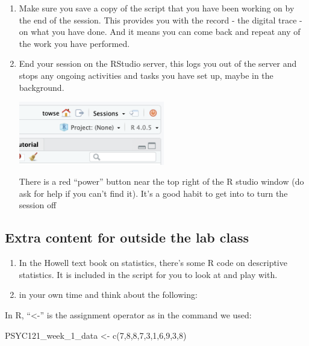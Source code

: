\documentclass[
]{book}
\newenvironment{Shaded}{\begin{snugshade}}{\end{snugshade}}
\newcommand{\DecValTok}[1]{\textcolor[rgb]{0.00,0.00,0.81}{#1}}
\newcommand{\FunctionTok}[1]{\textcolor[rgb]{0.00,0.00,0.00}{#1}}
\newcommand{\NormalTok}[1]{#1}
\newcommand{\OtherTok}[1]{\textcolor[rgb]{0.56,0.35,0.01}{#1}}
\begin{document}
\begin{enumerate}
\def\labelenumi{\alph{enumi})}
\item
  Make sure you save a copy of the script that you have been working on by the end of the session. This provides you with the record - the digital trace - on what you have done. And it means you can come back and repeat any of the work you have performed.
\item
  End your session on the RStudio server, this logs you out of the server and stops any ongoing activities and tasks you have set up, maybe in the background.

  \includegraphics[width=2.5in,height=\textheight]{files/Week_1/power_button.png}

  There is a red ``power'' button near the top right of the R studio window (do ask for help if you can't find it). It's a good habit to get into to turn the session off
\end{enumerate}

\hypertarget{extra-content-for-outside-the-lab-class}{%
\subsection{Extra content for outside the lab class}\label{extra-content-for-outside-the-lab-class}}

\begin{enumerate}
\def\labelenumi{\alph{enumi})}
\item
  In the Howell text book on statistics, there's some R code on descriptive statistics. It is included in the script for you to look at and play with.
\item
  in your own time and think about the following:
\end{enumerate}

In R, ``\textless-'' is the assignment operator as in the command we used:

\begin{Shaded}
\begin{Highlighting}[]
\NormalTok{PSYC121\_week\_1\_data }\OtherTok{\textless{}{-}} \FunctionTok{c}\NormalTok{(}\DecValTok{7}\NormalTok{,}\DecValTok{8}\NormalTok{,}\DecValTok{8}\NormalTok{,}\DecValTok{7}\NormalTok{,}\DecValTok{3}\NormalTok{,}\DecValTok{1}\NormalTok{,}\DecValTok{6}\NormalTok{,}\DecValTok{9}\NormalTok{,}\DecValTok{3}\NormalTok{,}\DecValTok{8}\NormalTok{)}
\end{Highlighting}
\end{Shaded}
\end{document}
